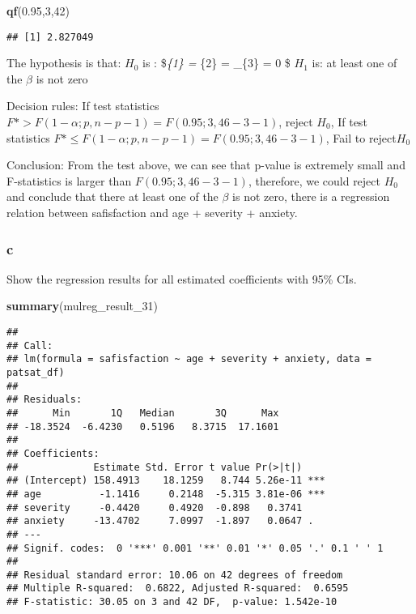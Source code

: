 \documentclass[]{article}
\newenvironment{Shaded}{\begin{snugshade}}{\end{snugshade}}
\newcommand{\KeywordTok}[1]{\textcolor[rgb]{0.13,0.29,0.53}{\textbf{#1}}}
\newcommand{\DecValTok}[1]{\textcolor[rgb]{0.00,0.00,0.81}{#1}}
\newcommand{\FloatTok}[1]{\textcolor[rgb]{0.00,0.00,0.81}{#1}}
\newcommand{\NormalTok}[1]{#1}
\begin{document}
\begin{Shaded}
\begin{Highlighting}[]
\KeywordTok{qf}\NormalTok{(}\FloatTok{0.95}\NormalTok{,}\DecValTok{3}\NormalTok{,}\DecValTok{42}\NormalTok{)}
\end{Highlighting}
\end{Shaded}

\begin{verbatim}
## [1] 2.827049
\end{verbatim}

The hypothesis is that: \(H_{0}\) is : \$\beta\emph{\{1\} = \beta}\{2\}
= \beta\_\{3\} = 0 \$ \(H_{1}\) is: at least one of the \(\beta\) is not
zero

Decision rules: If test statistics
\(F* > F(1-\alpha;p,n-p-1) = F(0.95;3,46-3-1)\), reject \(H_{0}\), If
test statistics \(F* \leqslant F(1-\alpha;p,n-p-1) = F(0.95;3,46-3-1)\),
Fail to reject\(H_{0}\)

Conclusion: From the test above, we can see that p-value is extremely
small and F-statistics is larger than \(F(0.95;3,46-3-1)\), therefore,
we could reject \(H_{0}\) and conclude that there at least one of the
\(\beta\) is not zero, there is a regression relation between
safisfaction and age + severity + anxiety.

\subsubsection{c}\label{c-2}

Show the regression results for all estimated coefficients with 95\%
CIs.

\begin{Shaded}
\begin{Highlighting}[]
\KeywordTok{summary}\NormalTok{(mulreg_result_}\DecValTok{31}\NormalTok{)}
\end{Highlighting}
\end{Shaded}

\begin{verbatim}
## 
## Call:
## lm(formula = safisfaction ~ age + severity + anxiety, data = patsat_df)
## 
## Residuals:
##      Min       1Q   Median       3Q      Max 
## -18.3524  -6.4230   0.5196   8.3715  17.1601 
## 
## Coefficients:
##             Estimate Std. Error t value Pr(>|t|)    
## (Intercept) 158.4913    18.1259   8.744 5.26e-11 ***
## age          -1.1416     0.2148  -5.315 3.81e-06 ***
## severity     -0.4420     0.4920  -0.898   0.3741    
## anxiety     -13.4702     7.0997  -1.897   0.0647 .  
## ---
## Signif. codes:  0 '***' 0.001 '**' 0.01 '*' 0.05 '.' 0.1 ' ' 1
## 
## Residual standard error: 10.06 on 42 degrees of freedom
## Multiple R-squared:  0.6822, Adjusted R-squared:  0.6595 
## F-statistic: 30.05 on 3 and 42 DF,  p-value: 1.542e-10
\end{verbatim}
\end{document}
